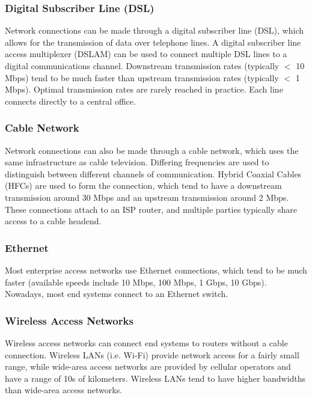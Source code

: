 \documentclass[12pt,titlepage]{article}
\begin{document}
      \subsubsection{Digital Subscriber Line (DSL)}
        Network connections can be made through a digital subscriber line (DSL), which allows for the transmission of data over
        telephone lines. A digital subscriber line access multiplexer (DSLAM) can be used to connect multiple DSL lines to a digital
        communications channel. Downstream transmission rates (typically $<$ 10 Mbps) tend to be much faster than upstream transmission
        rates (typically $<$ 1 Mbps). Optimal transmission rates are rarely reached in practice. Each line connects directly to a
        central office.

      \subsubsection{Cable Network}
        Network connections can also be made through a cable network, which uses the same infrastructure as cable television.
        Differing frequencies are used to distinguish between different channels of communication. Hybrid Coaxial Cables (HFCs) are
        used to form the connection, which tend to have a downstream transmission around 30 Mbps and an upstream transmission around
        2 Mbps. These connections attach to an ISP router, and multiple parties typically share access to a cable headend.

      \subsubsection{Ethernet}
        Most enterprise access networks use Ethernet connections, which tend to be much faster (available speeds include 10 Mbps, 100 Mbps,
        1 Gbps, 10 Gbps). Nowadays, most end systems connect to an Ethernet switch.

      \subsubsection{Wireless Access Networks}
        Wireless access networks can connect end systems to routers without a cable connection. Wireless LANs (i.e. Wi-Fi) provide network
        access for a fairly small range, while wide-area access networks are provided by cellular operators and have a range of 10s of
        kilometers. Wireless LANs tend to have higher bandwidths than wide-area access networks.
\end{document}
